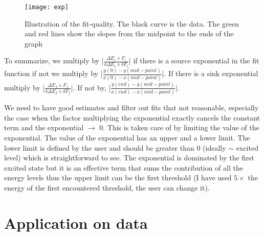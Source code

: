 \documentclass[10pt]{article}
\begin{document}
\begin{itemize}
\begin{figure}
\label{fig:exp}
\centering
\texttt{[image: exp]}
\caption{ Illustration of the fit-quality. The black curve is the data. The green and red lines show the slopes from the midpoint to the ends of the graph }
\end{figure}
To summarize, we multiply by |$\frac{\Delta E_i\times F_i}{\delta \Delta E_i\times \delta F_i}$| if there is a source exponential in the fit function if not we multiply by |$\frac{y(0) - y(mid-point)}{x(0) - x(mid-point)}$|. If there is a sink exponential multiply by |$\frac{\Delta E_f\times F_f}{\delta \Delta E_f\times \delta F_f}$|. If not by, |$\frac{y(end) - y(mid-point)}{x(end) - x(mid-point)}$|.\par
We need to have good estimates and filter out fits that not reasonable, especially the case when the factor multiplying the exponential exactly cancels the constant term and the exponential $\rightarrow$ 0. This is taken care of by limiting the value of the exponential. The value of the exponential has an upper and a lower limit. The lower limit is defined by the user and should be greater than 0 (ideally $\sim$ excited level) which is straightforward to see. The exponential is dominated by the first excited state but it is an effective term that sums the contribution of all the energy levels thus the upper limit can be the first threshold (I have used $5\times$ the energy of the first encountered threshold, the user can change it).\par
\end{itemize}
\section{Application on data}
\end{document}
